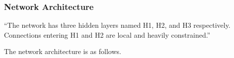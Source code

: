 \documentclass[10pt]{article}
\begin{document}


\subsubsection*{Network Architecture}
``The network has three hidden layers named H1, H2, and H3 respectively. Connections entering H1 and H2 are local and heavily constrained.''


The network architecture is as follows.
\end{document}
